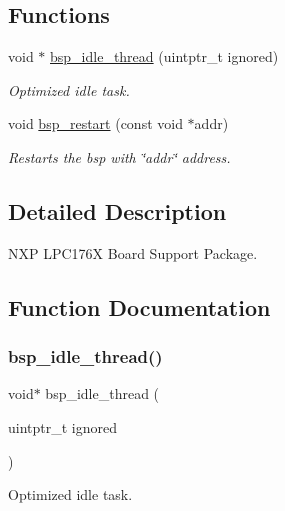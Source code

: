 \subsection*{Functions}
\begin{DoxyCompactItemize}
\item 
void $\ast$ \mbox{\hyperlink{group__RTEMSBSPsARMLPC176X_ga301be7085b80c41a9c5887247003c662}{bsp\+\_\+idle\+\_\+thread}} (uintptr\+\_\+t ignored)
\begin{DoxyCompactList}\small\item\em Optimized idle task. \end{DoxyCompactList}\item 
void \mbox{\hyperlink{group__RTEMSBSPsARMLPC176X_ga08ef43e56b67c49881940f59129113aa}{bsp\+\_\+restart}} (const void $\ast$addr)
\begin{DoxyCompactList}\small\item\em Restarts the bsp with \char`\"{}addr\char`\"{} address. \end{DoxyCompactList}\end{DoxyCompactItemize}


\subsection{Detailed Description}
N\+XP L\+P\+C176X Board Support Package. 



\subsection{Function Documentation}
\mbox{\label{group__RTEMSBSPsARMLPC176X_ga301be7085b80c41a9c5887247003c662}} 
\subsubsection{\texorpdfstring{bsp\_idle\_thread()}{bsp\_idle\_thread()}}
{\footnotesize\ttfamily void$\ast$ bsp\+\_\+idle\+\_\+thread (\begin{DoxyParamCaption}\item[{uintptr\+\_\+t}]{ignored }\end{DoxyParamCaption})}



Optimized idle task. 

